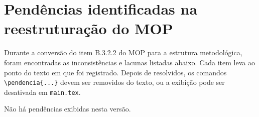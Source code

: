 \chapter{Pendências identificadas na reestruturação do MOP}
\label{ap:pendencias}

Durante a conversão do item B.3.2.2 do MOP para a estrutura metodológica,
foram encontradas as inconsistências e lacunas listadas abaixo. Cada item
leva ao ponto do texto em que foi registrado. Depois de resolvidos, os
comandos \verb|\pendencia{...}| devem ser removidos do texto, ou a exibição
pode ser desativada em \texttt{main.tex}.

\ifmostrarpendencias
  \listapendencias
\else
  Não há pendências exibidas nesta versão.
\fi
